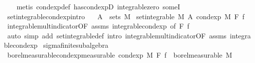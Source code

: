 \begin{isabellebody}
%
\isadelimproof
\ \ %
\endisadelimproof
%
\isatagproof
{}\isamarkupfalse%
\ {\isacharparenleft}{\kern0pt}metis\ cond{\isacharunderscore}{\kern0pt}exp{\isacharunderscore}{\kern0pt}def\ has{\isacharunderscore}{\kern0pt}cond{\isacharunderscore}{\kern0pt}expD{\isacharparenleft}{\kern0pt}{}{\isacharparenright}{\kern0pt}\ integrable{\isacharunderscore}{\kern0pt}zero\ someI{\isacharparenright}{\kern0pt}%
\endisatagproof
{\isafoldproof}%
%
\isadelimproof
\isanewline
%
\endisadelimproof
\isanewline
{}\isamarkupfalse%
\ set{\isacharunderscore}{\kern0pt}integrable{\isacharunderscore}{\kern0pt}cond{\isacharunderscore}{\kern0pt}exp{\isacharbrackleft}{\kern0pt}intro{\isacharbrackright}{\kern0pt}{\isacharcolon}{\kern0pt}\isanewline
\ \ \ {\isachardoublequoteopen}A\ {\isasymin}\ sets\ M{\isachardoublequoteclose}\isanewline
{}\ {\isachardoublequoteopen}set{\isacharunderscore}{\kern0pt}integrable\ M\ A\ {\isacharparenleft}{\kern0pt}cond{\isacharunderscore}{\kern0pt}exp\ M\ F\ f{\isacharparenright}{\kern0pt}{\isachardoublequoteclose}%
\isadelimproof
\ %
\endisadelimproof
%
\isatagproof
{}\isamarkupfalse%
\ integrable{\isacharunderscore}{\kern0pt}mult{\isacharunderscore}{\kern0pt}indicator{\isacharbrackleft}{\kern0pt}OF\ assms\ integrable{\isacharunderscore}{\kern0pt}cond{\isacharunderscore}{\kern0pt}exp{\isacharcomma}{\kern0pt}\ of\ F\ f{\isacharbrackright}{\kern0pt}\ \isamarkupfalse%
\ {\isacharparenleft}{\kern0pt}auto\ simp\ add{\isacharcolon}{\kern0pt}\ set{\isacharunderscore}{\kern0pt}integrable{\isacharunderscore}{\kern0pt}def\ intro{\isacharbang}{\kern0pt}{\isacharcolon}{\kern0pt}\ integrable{\isacharunderscore}{\kern0pt}mult{\isacharunderscore}{\kern0pt}indicator{\isacharbrackleft}{\kern0pt}OF\ assms\ integrable{\isacharunderscore}{\kern0pt}cond{\isacharunderscore}{\kern0pt}exp{\isacharbrackright}{\kern0pt}{\isacharparenright}{\kern0pt}%
\endisatagproof
{\isafoldproof}%
%
\isadelimproof
%
\endisadelimproof
\isanewline
\isanewline
{}\isamarkupfalse%
\ sigma{\isacharunderscore}{\kern0pt}finite{\isacharunderscore}{\kern0pt}subalgebra\isanewline
{}\isanewline
\isanewline
{}\isamarkupfalse%
\ borel{\isacharunderscore}{\kern0pt}measurable{\isacharunderscore}{\kern0pt}cond{\isacharunderscore}{\kern0pt}exp{\isacharprime}{\kern0pt}{\isacharbrackleft}{\kern0pt}measurable{\isacharbrackright}{\kern0pt}{\isacharcolon}{\kern0pt}\ {\isachardoublequoteopen}cond{\isacharunderscore}{\kern0pt}exp\ M\ F\ f\ {\isasymin}\ borel{\isacharunderscore}{\kern0pt}measurable\ M{\isachardoublequoteclose}\isanewline

\end{isabellebody}
